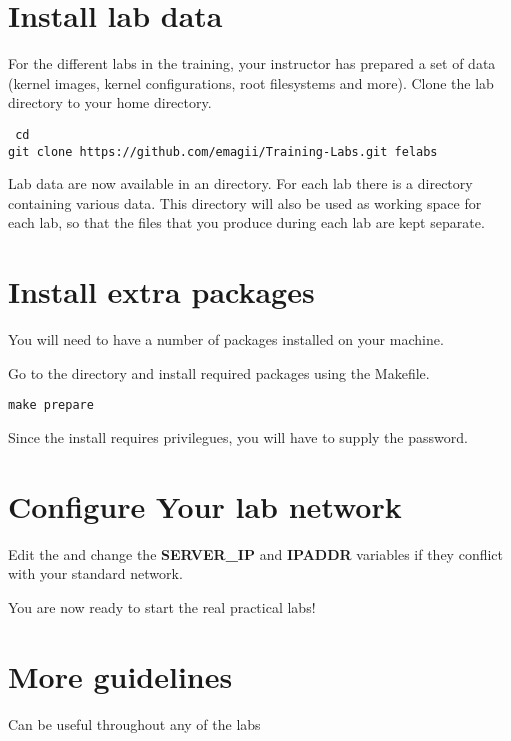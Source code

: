 
\section{Install lab data}

For the different labs in the training, your instructor has prepared a
set of data (kernel images, kernel configurations, root filesystems
and more). Clone the lab directory to your home directory.

{\small
{\tt
cd \\
git clone https://github.com/emagii/Training-Labs.git felabs
}
}

Lab data are now available in an \labdir directory. 
For each lab there is a directory containing various
data. This directory will also be used as working space for each lab,
so that the files that you produce during each lab are kept separate.

\section{Install extra packages}

You will need to have a number of packages installed on your machine.

Go to the \labdir directory and install required packages using the Makefile.

\begin{verbatim}
make prepare
\end{verbatim}

Since the install requires  privilegues, you will have to
supply the  password.

\section{Configure Your lab network}

Edit the  and change the {\bf SERVER\_IP} and {\bf IPADDR} variables if
they conflict with your standard network.

You are now ready to start the real practical labs!

\clearpage
\section{More guidelines}

Can be useful throughout any of the labs

